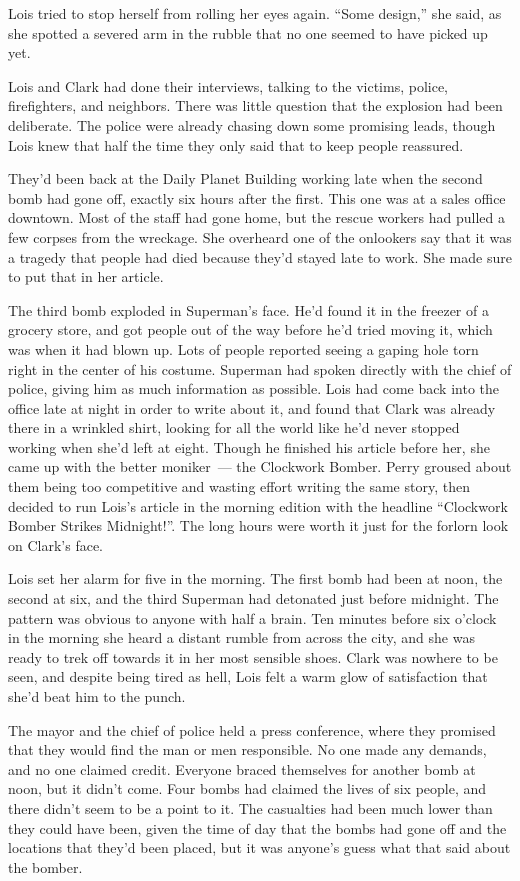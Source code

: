 \documentclass[ebook,12pt]{memoir}
\begin{document}
Lois tried to stop herself from rolling her eyes again. ``Some design,''
she said, as she spotted a severed arm in the rubble that no one seemed
to have picked up yet.

Lois and Clark had done their interviews, talking to the victims,
police, firefighters, and neighbors. There was little question that the
explosion had been deliberate. The police were already chasing down some
promising leads, though Lois knew that half the time they only said that
to keep people reassured.

They'd been back at the Daily Planet Building working late when the
second bomb had gone off, exactly six hours after the first. This one
was at a sales office downtown. Most of the staff had gone home, but the
rescue workers had pulled a few corpses from the wreckage. She overheard
one of the onlookers say that it was a tragedy that people had died
because they'd stayed late to work. She made sure to put that in her
article.

The third bomb exploded in Superman's face. He'd found it in the freezer
of a grocery store, and got people out of the way before he'd tried
moving it, which was when it had blown up. Lots of people reported
seeing a gaping hole torn right in the center of his costume. Superman
had spoken directly with the chief of police, giving him as much
information as possible. Lois had come back into the office late at
night in order to write about it, and found that Clark was already there
in a wrinkled shirt, looking for all the world like he'd never stopped
working when she'd left at eight. Though he finished his article before
her, she came up with the better moniker~--- the Clockwork Bomber. Perry
groused about them being too competitive and wasting effort writing the
same story, then decided to run Lois's article in the morning edition
with the headline ``Clockwork Bomber Strikes Midnight!''. The long hours
were worth it just for the forlorn look on Clark's face.

Lois set her alarm for five in the morning. The first bomb had been at
noon, the second at six, and the third Superman had detonated just
before midnight. The pattern was obvious to anyone with half a brain.
Ten minutes before six o'clock in the morning she heard a distant rumble
from across the city, and she was ready to trek off towards it in her
most sensible shoes. Clark was nowhere to be seen, and despite being
tired as hell, Lois felt a warm glow of satisfaction that she'd beat him
to the punch.

The mayor and the chief of police held a press conference, where they
promised that they would find the man or men responsible. No one made
any demands, and no one claimed credit. Everyone braced themselves for
another bomb at noon, but it didn't come. Four bombs had claimed the
lives of six people, and there didn't seem to be a point to it. The
casualties had been much lower than they could have been, given the time
of day that the bombs had gone off and the locations that they'd been
placed, but it was anyone's guess what that said about the bomber.
\end{document}
